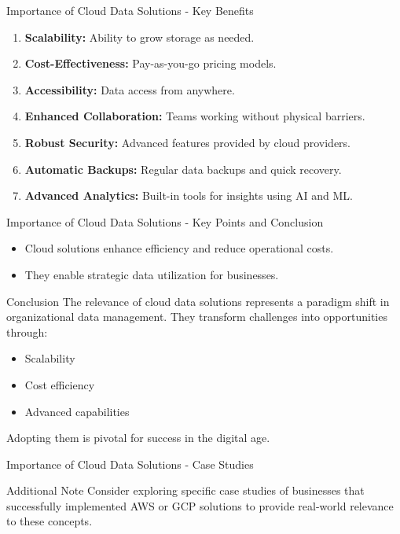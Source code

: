 \documentclass[aspectratio=169]{beamer}
\begin{document}
\begin{frame}[fragile]{Importance of Cloud Data Solutions - Key Benefits}
    \begin{enumerate}
        \item \textbf{Scalability:} Ability to grow storage as needed.
        \item \textbf{Cost-Effectiveness:} Pay-as-you-go pricing models.
        \item \textbf{Accessibility:} Data access from anywhere.
        \item \textbf{Enhanced Collaboration:} Teams working without physical barriers.
        \item \textbf{Robust Security:} Advanced features provided by cloud providers.
        \item \textbf{Automatic Backups:} Regular data backups and quick recovery.
        \item \textbf{Advanced Analytics:} Built-in tools for insights using AI and ML.
    \end{enumerate}
\end{frame}

\begin{frame}[fragile]{Importance of Cloud Data Solutions - Key Points and Conclusion}
    \begin{itemize}
        \item Cloud solutions enhance efficiency and reduce operational costs.
        \item They enable strategic data utilization for businesses.
    \end{itemize}
    
    \begin{block}{Conclusion}
        The relevance of cloud data solutions represents a paradigm shift in organizational data management. 
        They transform challenges into opportunities through:
        \begin{itemize}
            \item Scalability
            \item Cost efficiency
            \item Advanced capabilities
        \end{itemize}
        Adopting them is pivotal for success in the digital age.
    \end{block}
\end{frame}

\begin{frame}[fragile]{Importance of Cloud Data Solutions - Case Studies}
    \begin{block}{Additional Note}
        Consider exploring specific case studies of businesses that successfully implemented AWS or GCP solutions to provide real-world relevance to these concepts.
    \end{block}
\end{frame}
\end{document}
